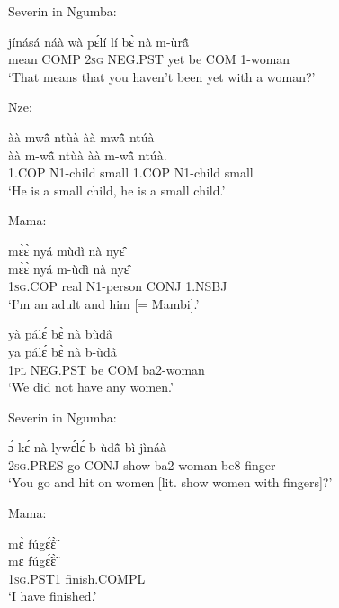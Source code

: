 \noindent Severin in Ngumba:

\begin{exe} 
\exC\label{179} 
  \gll  jínásá náà wà pɛ́lí lí bɛ̀ nà m-ùrã̂ \\
          mean COMP 2\textsc{sg} NEG.PST yet be COM 1-woman \\
    \trans `That means that you haven't been yet with a woman?'
\end{exe}

\noindent Nze:

\begin{exe} 
\exC\label{180}
  \glll àà mwã̂ ntùà àà mwã̂ ntúà \\
       àà m-wã̂ ntùà àà m-wã̂ ntúà. \\
         1.COP N1-child small 1.COP N1-child small\\
    \trans `He is a small child, he is a small child.'
\end{exe}

\noindent Mama:

\begin{exe} 
\exC\label{181}
  \glll mɛ̀ɛ̀ nyá mùdì nà nyɛ̂ \\
        mɛ̀ɛ̀ nyá m-ùdì nà nyɛ̂ \\
        1\textsc{sg}.COP real N1-person CONJ 1.NSBJ  \\
    \trans `I'm an adult and him [= Mambi].'
\end{exe}

\begin{exe} 
\exC\label{182}
  \glll  yà pálɛ́ bɛ̀ nà bùdã̂ \\
      ya pálɛ́ bɛ̀ nà b-ùdã̂ \\
        1\textsc{pl} NEG.PST be COM ba2-woman  \\
    \trans `We did not have any women.'
\end{exe}

\noindent Severin in Ngumba:

\begin{exe} 
\exC\label{183} 
  \gll  ɔ́ kɛ́ nà lywɛ́lɛ́ b-ùdã̂ bì-jìnáà \\
        2\textsc{sg}.PRES go CONJ show ba2-woman be8-finger  \\
    \trans `You go and hit on women [lit. show women with fingers]?'
\end{exe}

\noindent Mama:

\begin{exe} 
\exC\label{184}
  \glll mɛ̀ fúgɛ̃́ɛ̃̀ \\
        mɛ fúgɛ̃́ɛ̃̀ \\
         1\textsc{sg}.PST1 finish.COMPL \\
    \trans `I have finished.'
\end{exe}

